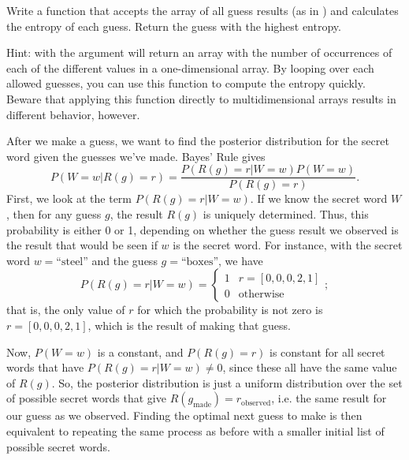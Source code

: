 \begin{problem}\label{infotheory:prob:entropies}
	Write a function that accepts the array of all guess results (as in ) and calculates the entropy of each guess.
	Return the guess with the highest entropy.

	Hint:  with the argument  will return an array with the number of occurrences of each of the different values in a one-dimensional array.
	By looping over each allowed guesses, you can use this function to compute the entropy quickly.
	Beware that applying this function directly to multidimensional arrays results in different behavior, however.
\end{problem}

After we make a guess, we want to find the posterior distribution for the secret word given the guesses we've made.
Bayes' Rule gives
\[
P(W=w|R(g)=r)=\frac{P(R(g)=r|W=w)P(W=w)}{P(R(g)=r)}.
\]
First, we look at the term \(P(R(g)=r|W=w)\).
If we know the secret word \(W\), then for any guess \(g\), the result \(R(g)\) is uniquely determined.
Thus, this probability is either 0 or 1, depending on whether the guess result we observed is the result that would be seen if \(w\) is the secret word.
For instance, with the secret word \(w=\text{``steel''}\) and the guess \(g=\text{``boxes''}\), we have
\[
P(R(g)=r|W=w)=\begin{cases}
1 & r=[0,0,0,2,1] \\
0 & \text{otherwise}
\end{cases};
\]
that is, the only value of \(r\) for which the probability is not zero is \(r=[0,0,0,2,1]\), which is the result of making that guess.

Now, \(P(W=w)\) is a constant, and \(P(R(g)=r)\) is constant for all secret words that have \(P(R(g)=r|W=w)\neq 0\), since these all have the same value of \(R(g)\).
So, the posterior distribution is just a uniform distribution over the set of possible secret words that give $R(g_\text{made})=r_\text{observed}$, i.e. the same result for our guess as we observed.
Finding the optimal next guess to make is then equivalent to repeating the same process as before with a smaller initial list of possible secret words.

